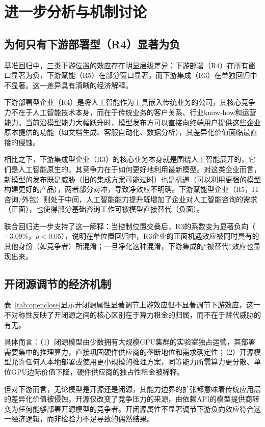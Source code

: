 \documentclass[11pt,fontset=fandol,a4paper]{ctexart}
\newcommand{\changed}[1]{#1}
\begin{document}
\section{进一步分析与机制讨论}

\subsection{为何只有下游部署型（R4）显著为负}

基准回归中，三类下游位置的效应存在明显层级差异：下游部署（R4）在所有窗口显著为负，下游赋能（R5）在部分窗口显著，而下游集成（R3）在单独回归中不显著。这一差异具有清晰的经济解释。

下游部署型企业（R4）是将人工智能作为工具嵌入传统业务的公司，其核心竞争力不在于人工智能技术本身，而在于传统业务的客户关系、行业know-how和运营能力。当前沿模型能力大幅跃升时，模型发布方可以直接向终端用户提供这些企业原本提供的功能（如文档生成、客服自动化、数据分析），其差异化价值面临最直接的侵蚀。

相比之下，下游集成型企业（R3）的核心业务本身就是围绕人工智能展开的，它们是人工智能原生的，其竞争力在于如何更好地利用最新模型。对这类企业而言，新模型的发布既是威胁（旧的集成方案可能过时）也是机遇（可以利用更强的模型构建更好的产品），两者部分对冲，导致净效应不明确。下游赋能型企业（R5，IT咨询/外包）则处于中间，人工智能能力提升既增加了企业对人工智能咨询的需求（正面），也使得部分基础咨询工作可被模型直接替代（负面）。

\changed{联合回归进一步支持了这一解释：当控制位置交叠后，R3的系数变为显著负向（$-3.09\%$，$p<0.05$），说明在单位置回归中，R3企业的正面机遇效应被同时具有的其他身份（如竞争者）所混淆；一旦净化这种混淆，下游集成的“被替代”效应也显现出来。}

\subsection{开闭源调节的经济机制}

表~\ref{tab:openclose}显示开闭源属性显著调节上游效应但不显著调节下游效应，这一不对称性反映了开闭源之间的核心区别在于算力租金的归属，而不在于替代威胁的有无。

具体而言：（1）闭源模型由少数拥有大规模GPU集群的实验室独占运营，其部署需要集中的推理算力，直接巩固硬件供应商的垄断地位和需求确定性；（2）开源模型允许任何人本地部署或使用更小规模的推理方案，同等能力所需算力更分散、单位GPU边际价值下降，硬件供应商的独占性租金被稀释。

但对下游而言，无论模型是开源还是闭源，其能力边界的扩张都意味着传统应用层的差异化价值被侵蚀，开源仅改变了竞争压力的来源，由依赖API的模型提供商转变为任何能够部署开源模型的竞争者。开闭源属性不显著调节下游负向效应符合这一经济逻辑，而非检验力不足导致的偶然结果。
\end{document}
